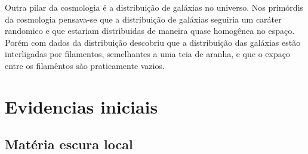 \documentclass[
	article,			%
	11pt,				%
	twoside,			%
	a4paper,			%
	english,			%
	brazil,				%
	sumario=tradicional
	]{abntex2}
\begin{document}
Outra pilar da cosmologia é a distribuição de galáxias no universo. Nos primórdis da cosmologia pensava-se que a distribuição de galáxias seguiria um caráter randomico e que estariam distribuidas de maneira quase homogênea no espaço.
Porém com dados da distribuição descobriu que a distribuição das galáxias estão interligadas por filamentos, semelhantes a uma teia de aranha, e que o expaço entre os filamêntos são praticamente vazios.

\section{Evidencias iniciais}
\subsection{Matéria escura local}
\end{document}
